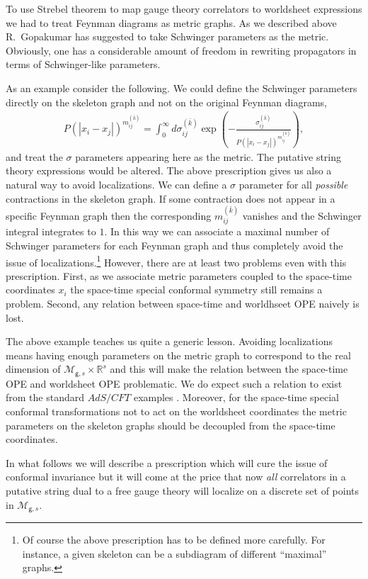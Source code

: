 \documentclass[11pt]{JHEP3}
\def\be{\begin{eqnarray}}
\def\ee{\end{eqnarray}}
\def\s{\sigma}
\def\s{\sigma}
\def\gg{\mathsf g }
\begin{document}
To use Strebel theorem to map gauge theory correlators to worldsheet 
expressions we had to treat Feynman diagrams as metric graphs. As we
described above R.~Gopakumar has suggested to take Schwinger parameters 
as the metric. Obviously, one has a considerable amount of freedom in rewriting
propagators in terms of Schwinger-like parameters.

As an example consider the following.
 We could define
the Schwinger parameters directly on the skeleton graph and not on the original
Feynman diagrams,
\be\label{metric2}
P(|x_i-x_j|)^{m_{ij}^{(\bar k)}}=\int_0^\infty d\s_{ij}^{(\bar k)} \exp\left(-\frac{\s_{ij}^{(\bar k)}}{P(|x_i-x_j|)^{m_{ij}^{(\bar k)}}}\right),
\ee and treat the $\s$ parameters appearing here as the metric. The putative string theory expressions  would be altered. The above prescription gives us also a natural way to avoid 
localizations. We can define a $\s$ parameter for all \textit{possible} contractions
in the skeleton graph. If some contraction does not appear in a specific Feynman graph then
the corresponding $m_{ij}^{(\bar k)}$ vanishes and the Schwinger integral integrates to $1$.
In this way we can associate a maximal number of Schwinger parameters for each 
Feynman graph and thus completely avoid the issue of localizations.\footnote{Of course the above
prescription has to be defined more carefully. For instance,  a given skeleton can be a subdiagram of different ``maximal'' graphs.} However, there are 
at least two problems even with this prescription. First, as we associate metric parameters
coupled to the space-time coordinates $x_i$ the space-time special conformal symmetry still 
remains a problem. Second, any relation between space-time and worldhseet OPE naively is lost.

The above example teaches us quite a generic lesson. Avoiding localizations means having
enough parameters on the metric graph to correspond to the real dimension of
${\mathcal M}_{\gg,s}\times{\mathbb R}^s$ and this will make the relation between the space-time
OPE and worldsheet OPE problematic. We do expect such a relation to exist from
the standard $AdS/CFT$ examples \cite{Aharony:2007rq}. Moreover, for the space-time
special conformal transformations not to act on the worldsheet coordinates the 
metric parameters on the skeleton graphs should be decoupled from the space-time 
coordinates.
 
In what follows we will describe a prescription which will cure the issue of conformal
invariance
 but it will come at the price that now \textit{all} correlators in a putative string dual to a free gauge theory  will localize on
 a discrete set of points in ${\mathcal M}_{\gg,s}$.
\end{document}
